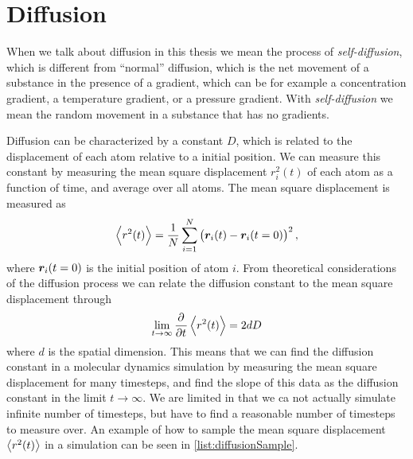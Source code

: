 \section{Diffusion}
When we talk about diffusion in this thesis we mean the process of \emph{self-diffusion}, which is different from ``normal'' diffusion, which is the net movement of a substance in the presence of a gradient, which can be for example a concentration gradient, a temperature gradient, or a pressure gradient. With \emph{self-diffusion} we mean the random movement in a substance that has no gradients.

Diffusion can be characterized by a constant $D$, which is related to the displacement of each atom relative to a initial position. We can measure this constant by measuring the mean square displacement $r_i^2(t)$ of each atom as a function of time, and average over all atoms. The mean square displacement is measured as
\begin{align*}
    \Braket{r^2(t)} = \frac{1}{N} \sum_{i=1}^N \left( \boldsymbol{r}_i(t) - \boldsymbol{r}_i(t=0) \right)^2,
\end{align*}
where $\boldsymbol{r}_i(t=0)$ is the initial position of atom $i$. From theoretical considerations of the diffusion process we can relate the diffusion constant to the mean square displacement through\cite[Section~4.4.1]{frenkel2001understanding}
\begin{align}
    \lim_{t\rightarrow \infty}\dpd{}{t}\Braket{r^2(t)} = 2dD\label{eq:diffusion_derivative}
\end{align}
where $d$ is the spatial dimension. This means that we can find the diffusion constant in a molecular dynamics simulation by measuring the mean square displacement for many timesteps, and find the slope of this data as the diffusion constant in the limit $t\rightarrow \infty$. We are limited in that we ca not actually simulate infinite number of timesteps, but have to find a reasonable number of timesteps to measure over. An example of how to sample the mean square displacement $\Braket{r^2(t)}$ in a simulation can be seen in \cref{list:diffusionSample}.
%
%
